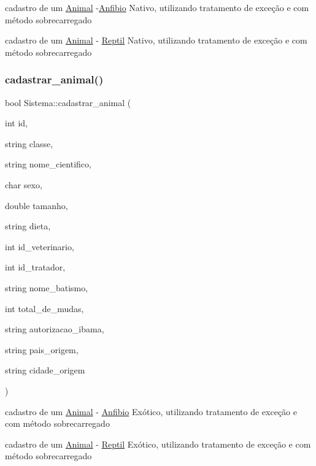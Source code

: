 cadastro de um \mbox{\hyperlink{class_animal}{Animal}} -\/\mbox{\hyperlink{class_anfibio}{Anfibio}} Nativo, utilizando tratamento de exceção e com método sobrecarregado 

cadastro de um \mbox{\hyperlink{class_animal}{Animal}} -\/ \mbox{\hyperlink{class_reptil}{Reptil}} Nativo, utilizando tratamento de exceção e com método sobrecarregado \mbox{\label{class_sistema_abb027a54e2c84f92c6416f379654632a}} 
\subsubsection{\texorpdfstring{cadastrar\_animal()}{cadastrar\_animal()}\hspace{0.1cm}{\footnotesize\ttfamily [3/12]}}
{\footnotesize\ttfamily bool Sistema\+::cadastrar\+\_\+animal (\begin{DoxyParamCaption}\item[{int}]{id,  }\item[{string}]{classe,  }\item[{string}]{nome\+\_\+cientifico,  }\item[{char}]{sexo,  }\item[{double}]{tamanho,  }\item[{string}]{dieta,  }\item[{int}]{id\+\_\+veterinario,  }\item[{int}]{id\+\_\+tratador,  }\item[{string}]{nome\+\_\+batismo,  }\item[{int}]{total\+\_\+de\+\_\+mudas,  }\item[{string}]{autorizacao\+\_\+ibama,  }\item[{string}]{pais\+\_\+origem,  }\item[{string}]{cidade\+\_\+origem }\end{DoxyParamCaption})}



cadastro de um \mbox{\hyperlink{class_animal}{Animal}} -\/ \mbox{\hyperlink{class_anfibio}{Anfibio}} Exótico, utilizando tratamento de exceção e com método sobrecarregado 

cadastro de um \mbox{\hyperlink{class_animal}{Animal}} -\/ \mbox{\hyperlink{class_reptil}{Reptil}} Exótico, utilizando tratamento de exceção e com método sobrecarregado \mbox{\label{class_sistema_abe8cab13768dcc8cf90c9a0fe9663af0}} 
